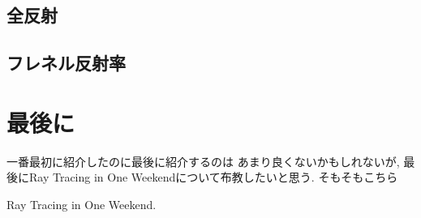 \documentclass[a4paper, xelatex, ja=standard]{bxjsarticle}
\begin{document}
\subsection{全反射}

\subsection{フレネル反射率}

\section{最後に}
一番最初に紹介したのに最後に紹介するのは
あまり良くないかもしれないが,
最後にRay Tracing in One Weekendについて布教したいと思う.
そもそもこちら

\begin{thebibliography}{9}
 Ray Tracing in One Weekend.
\end{thebibliography}
\end{document}
